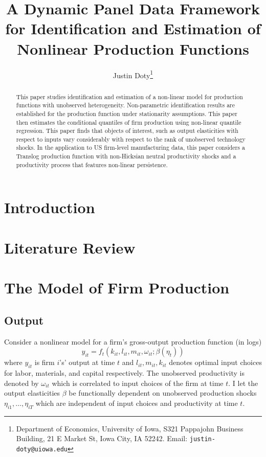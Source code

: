 \documentclass{article}
\title{A Dynamic Panel Data Framework for Identification and Estimation of Nonlinear Production Functions}
\author{Justin Doty\thanks{Department of Economics, University of Iowa, S321 Pappajohn Business Building, 21 E Market St, Iowa City, IA 52242. Email: \texttt{justin-doty@uiowa.edu}}
}
\date{\vspace{-5ex}}
\begin{document}
\maketitle{}

\begin{abstract}
This paper studies identification and estimation of a non-linear model for production functions with unobserved heterogeneity. Non-parametric identification results are established for the production function under stationarity assumptions. This paper then estimates the conditional quantiles of firm production using non-linear quantile regression. This paper finds that objects of interest, such as output elasticities with respect to inputs vary considerably with respect to the rank of unobserved technology shocks. In the application to US firm-level manufacturing data, this paper considers a Translog production function with non-Hicksian neutral productivity shocks and a productivity process that features non-linear persistence.
\end{abstract}

\section{Introduction}

\section{Literature Review}

\section{The Model of Firm Production} \label{model}

\subsection*{Output}
Consider a nonlinear model for a firm's gross-output production function (in logs)
\begin{equation}\label{modelY}
y_{it}=f_{t}(k_{it}, l_{it}, m_{it}, \omega_{it}; \beta(\eta_{t}))
\end{equation}
where $y_{it}$ is firm $i$'s' output at time $t$ and $l_{it}, m_{it}, k_{it}$ denotes optimal input choices for labor, materials, and capital respectively. The unobserved productivity is denoted by $\omega_{it}$ which is correlated to input choices of the firm at time $t$. I let the output elasticities $\beta$ be functionally dependent on unobserved production shocks $\eta_{i1},\dots, \eta_{iT}$ which are independent of input choices and productivity at time $t$.\\
\end{document}
